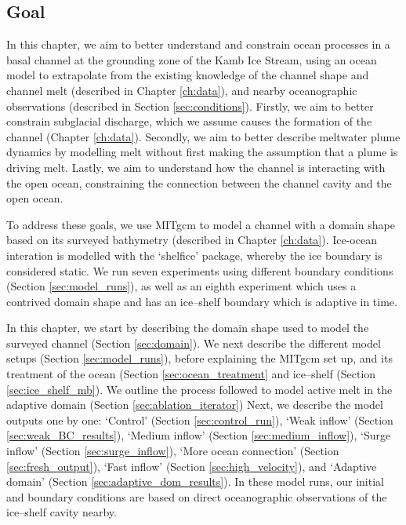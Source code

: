 \subsection{ Goal}
In this chapter, we aim to better understand and constrain ocean processes in a basal channel at the grounding zone of the Kamb Ice Stream, using an ocean model to extrapolate from the existing knowledge of the channel shape and channel melt (described in Chapter \ref{ch:data}), and nearby oceanographic observations (described in Section \ref{sec:conditions}).  Firstly, we aim to better constrain subglacial discharge, which we assume causes the formation of the channel (Chapter \ref{ch:data}). Secondly, we aim to better describe meltwater plume dynamics by modelling melt without first making the assumption that a plume is driving melt. Lastly, we aim to understand how the channel is interacting with the open ocean, constraining the connection between the channel cavity and the open ocean. 

To address these goals, we use MITgcm to model a channel with a domain shape based on its surveyed bathymetry (described in Chapter \ref{ch:data}). 
Ice-ocean interation is modelled with the `shelfice' package, whereby the ice boundary is considered static. We run seven experiments using different boundary conditions (Section \ref{sec:model_runs}), as well as an eighth experiment which uses a contrived domain shape and has an ice--shelf boundary which is adaptive in time.


In this chapter, we start by describing the domain shape used to model the surveyed channel  (Section \ref{sec:domain}). We next describe the different model setups (Section \ref{sec:model_runs}), before explaining the MITgcm set up, and its treatment of the ocean (Section \ref{sec:ocean_treatment} and ice--shelf (Section \ref{sec:ice_shelf_mb}). We outline the process followed to model active melt in the adaptive domain (Section  \ref{sec:ablation_iterator}) Next, we describe the model outputs one by one: `Control' (Section \ref{sec:control_run}), `Weak inflow' (Section \ref{sec:weak_BC_results}), `Medium inflow' (Section \ref{sec:medium_inflow}), `Surge inflow' (Section \ref{sec:surge_inflow}), `More ocean connection' (Section \ref{sec:fresh_output}), `Fast inflow' (Section \ref{sec:high_velocity}), and `Adaptive domain' (Section \ref{sec:adaptive_dom_results}).
In these model runs, our initial and boundary conditions are based on direct oceanographic observations of the ice--shelf cavity nearby.


